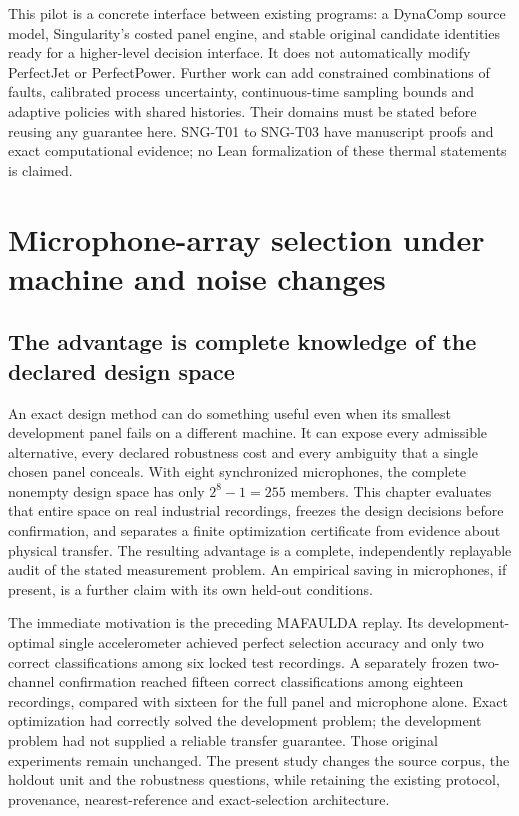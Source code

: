 \documentclass[
  11pt,
  a4paper,
]{report}
\begin{document}
This pilot is a concrete interface between existing programs: a DynaComp
source model, Singularity's costed panel engine, and stable original
candidate identities ready for a higher-level decision interface. It
does not automatically modify PerfectJet or PerfectPower. Further work
can add constrained combinations of faults, calibrated process
uncertainty, continuous-time sampling bounds and adaptive policies with
shared histories. Their domains must be stated before reusing any
guarantee here. SNG-T01 to SNG-T03 have manuscript proofs and exact
computational evidence; no Lean formalization of these thermal
statements is claimed.

\hypertarget{microphone-array-selection-under-machine-and-noise-changes}{%
\chapter{Microphone-array selection under machine and noise
changes}\label{microphone-array-selection-under-machine-and-noise-changes}}

\hypertarget{the-advantage-is-complete-knowledge-of-the-declared-design-space}{%
\section{The advantage is complete knowledge of the declared design
space}\label{the-advantage-is-complete-knowledge-of-the-declared-design-space}}

An exact design method can do something useful even when its smallest
development panel fails on a different machine. It can expose every
admissible alternative, every declared robustness cost and every
ambiguity that a single chosen panel conceals. With eight synchronized
microphones, the complete nonempty design space has only \(2^8-1=255\)
members. This chapter evaluates that entire space on real industrial
recordings, freezes the design decisions before confirmation, and
separates a finite optimization certificate from evidence about physical
transfer. The resulting advantage is a complete, independently
replayable audit of the stated measurement problem. An empirical saving
in microphones, if present, is a further claim with its own held-out
conditions.

The immediate motivation is the preceding MAFAULDA replay. Its
development-optimal single accelerometer achieved perfect selection
accuracy and only two correct classifications among six locked test
recordings. A separately frozen two-channel confirmation reached fifteen
correct classifications among eighteen recordings, compared with sixteen
for the full panel and microphone alone. Exact optimization had
correctly solved the development problem; the development problem had
not supplied a reliable transfer guarantee. Those original experiments
remain unchanged. The present study changes the source corpus, the
holdout unit and the robustness questions, while retaining the existing
protocol, provenance, nearest-reference and exact-selection
architecture.
\end{document}
